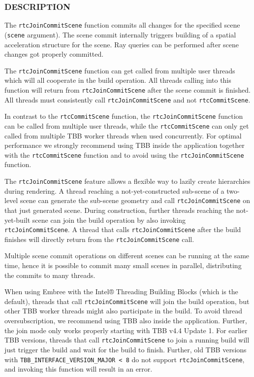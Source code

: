 \subsubsection{DESCRIPTION}\label{description}

The \texttt{rtcJoinCommitScene} function commits all changes for the
specified scene (\texttt{scene} argument). The scene commit internally
triggers building of a spatial acceleration structure for the scene. Ray
queries can be performed after scene changes got properly committed.

The \texttt{rtcJoinCommitScene} function can get called from multiple
user threads which will all cooperate in the build operation. All
threads calling into this function will return from
\texttt{rtcJoinCommitScene} after the scene commit is finished. All
threads must consistently call \texttt{rtcJoinCommitScene} and not
\texttt{rtcCommitScene}.

In contrast to the \texttt{rtcCommitScene} function, the
\texttt{rtcJoinCommitScene} function can be called from multiple user
threads, while the \texttt{rtcCommitScene} can only get called from
multiple TBB worker threads when used concurrently. For optimal
performance we strongly recommend using TBB inside the application
together with the \texttt{rtcCommitScene} function and to avoid using
the \texttt{rtcJoinCommitScene} function.

The \texttt{rtcJoinCommitScene} feature allows a flexible way to lazily
create hierarchies during rendering. A thread reaching a
not-yet-constructed sub-scene of a two-level scene can generate the
sub-scene geometry and call \texttt{rtcJoinCommitScene} on that just
generated scene. During construction, further threads reaching the
not-yet-built scene can join the build operation by also invoking
\texttt{rtcJoinCommitScene}. A thread that calls
\texttt{rtcJoinCommitScene} after the build finishes will directly
return from the \texttt{rtcJoinCommitScene} call.

Multiple scene commit operations on different scenes can be running at
the same time, hence it is possible to commit many small scenes in
parallel, distributing the commits to many threads.

When using Embree with the Intel® Threading Building Blocks (which is
the default), threads that call \texttt{rtcJoinCommitScene} will join
the build operation, but other TBB worker threads might also participate
in the build. To avoid thread oversubscription, we recommend using TBB
also inside the application. Further, the join mode only works properly
starting with TBB v4.4 Update 1. For earlier TBB versions, threads that
call \texttt{rtcJoinCommitScene} to join a running build will just
trigger the build and wait for the build to finish. Further, old TBB
versions with \texttt{TBB\_INTERFACE\_VERSION\_MAJOR\ \textless{}\ 8} do
not support \texttt{rtcJoinCommitScene}, and invoking this function will
result in an error.

